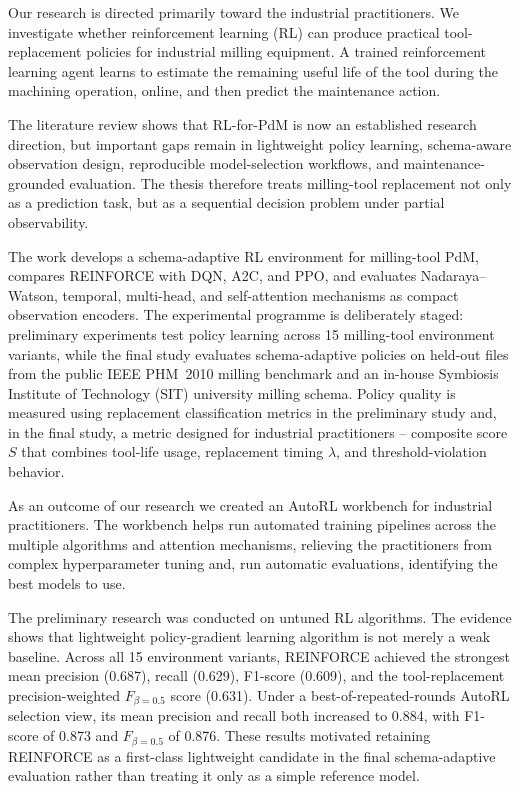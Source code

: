 \documentclass[12pt,oneside]{book}
\begin{document}
Our research is directed primarily toward the industrial practitioners. We investigate whether reinforcement learning (RL) can produce practical tool-replacement policies for industrial milling equipment. A trained reinforcement learning agent learns to estimate the remaining useful life of the tool during the machining operation, online, and then predict the maintenance action. 

The literature review shows that RL-for-PdM is now an established research direction, but important gaps remain in lightweight policy learning, schema-aware observation design, reproducible model-selection workflows, and maintenance-grounded evaluation. The thesis therefore treats milling-tool replacement not only as a prediction task, but as a sequential decision problem under partial observability.

The work develops a schema-adaptive RL environment for milling-tool PdM, compares \textsc{REINFORCE} with DQN, A2C, and PPO, and evaluates Nadaraya--Watson, temporal, multi-head, and self-attention mechanisms as compact observation encoders. The experimental programme is deliberately staged: preliminary experiments test policy learning across 15 milling-tool environment variants, while the final study evaluates schema-adaptive policies on held-out files from the public IEEE PHM~2010 milling benchmark and an in-house Symbiosis Institute of Technology (SIT) university milling schema. Policy quality is measured using replacement classification metrics in the preliminary study and, in the final study, a metric designed for industrial practitioners -- composite score $S$ that combines tool-life usage, replacement timing $\lambda$, and threshold-violation behavior.

As an outcome of our research we created an AutoRL workbench for industrial practitioners. The workbench helps run automated training pipelines across the multiple algorithms and attention mechanisms, relieving the practitioners from complex hyperparameter tuning and, run automatic evaluations, identifying the best models to use.

The preliminary research was conducted on untuned RL algorithms. The evidence shows that lightweight policy-gradient learning algorithm is not merely a weak baseline. Across all 15 environment variants, \textsc{REINFORCE} achieved the strongest mean precision (0.687), recall (0.629), F1-score (0.609), and the tool-replacement precision-weighted $F_{\beta=0.5}$ score (0.631). Under a best-of-repeated-rounds AutoRL selection view, its mean precision and recall both increased to 0.884, with F1-score of 0.873 and $F_{\beta=0.5}$ of 0.876. These results motivated retaining \textsc{REINFORCE} as a first-class lightweight candidate in the final schema-adaptive evaluation rather than treating it only as a simple reference model.
\end{document}
